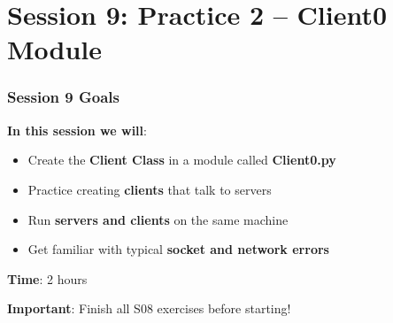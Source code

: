 \documentclass[xcolor=table]{beamer}
\begin{document}

\section{Session 9: Practice 2 -- Client0 Module}

\begin{frame}
\frametitle{Session 9 Goals}

\textbf{In this session we will}:

\begin{itemize}
\item Create the \textbf{Client Class} in a module called \textbf{Client0.py}
\item Practice creating \textbf{clients} that talk to servers
\item Run \textbf{servers and clients} on the same machine
\item Get familiar with typical \textbf{socket and network errors}
\end{itemize}

\vspace{0.5cm}

\textbf{Time}: 2 hours

\vspace{0.3cm}

\textbf{Important}: Finish all S08 exercises before starting!

\end{frame}
\end{document}
